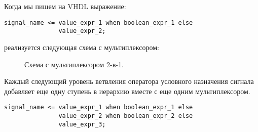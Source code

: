 Когда мы пишем на VHDL выражение:
\begin{Code}
\begin{lstlisting}
signal_name <= value_expr_1 when boolean_expr_1 else 
               value_expr_2;
\end{lstlisting}
\end{Code}

реализуется следующая схема с мультиплексором:

\begin{figure}[ht]
\centering
{}
\caption{Схема с мультиплексором 2-в-1.}
\label{mux_fig_1}
\end{figure}

Каждый следующий уровень ветвления оператора условного назначения сигнала добавляет еще одну ступень в иерархию вместе с еще одним мультиплексором.
\begin{Code}
\begin{lstlisting}
signal_name <= value_expr_1 when boolean_expr_1 else 
               value_expr_2 when boolean_expr_2 else 
               value_expr_3;
\end{lstlisting}
\end{Code}

